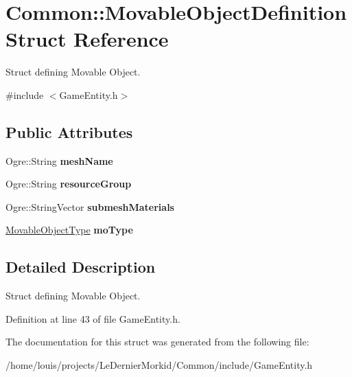 \hypertarget{struct_common_1_1_movable_object_definition}{}\section{Common\+:\+:Movable\+Object\+Definition Struct Reference}
\label{struct_common_1_1_movable_object_definition}


Struct defining Movable Object.  




{\ttfamily \#include $<$Game\+Entity.\+h$>$}

\subsection*{Public Attributes}
\begin{DoxyCompactItemize}
\item 
\mbox{\label{struct_common_1_1_movable_object_definition_a2421cd0320f356ac07de4b53360547a6}} 
Ogre\+::\+String {\bfseries mesh\+Name}
\item 
\mbox{\label{struct_common_1_1_movable_object_definition_ac43b5c32c8357b59a94201216cd02085}} 
Ogre\+::\+String {\bfseries resource\+Group}
\item 
\mbox{\label{struct_common_1_1_movable_object_definition_ae7c8198fd708a0f8abe946f42461a691}} 
Ogre\+::\+String\+Vector {\bfseries submesh\+Materials}
\item 
\mbox{\label{struct_common_1_1_movable_object_definition_aeb4c2de96c472af36d917cc68fc9e220}} 
\hyperlink{group___common_gaa693ad2642037f65cbba42cdc3e41636}{Movable\+Object\+Type} {\bfseries mo\+Type}
\end{DoxyCompactItemize}


\subsection{Detailed Description}
Struct defining Movable Object. 

Definition at line 43 of file Game\+Entity.\+h.



The documentation for this struct was generated from the following file\+:\begin{DoxyCompactItemize}
\item 
/home/louis/projects/\+Le\+Dernier\+Morkid/\+Common/include/Game\+Entity.\+h\end{DoxyCompactItemize}
